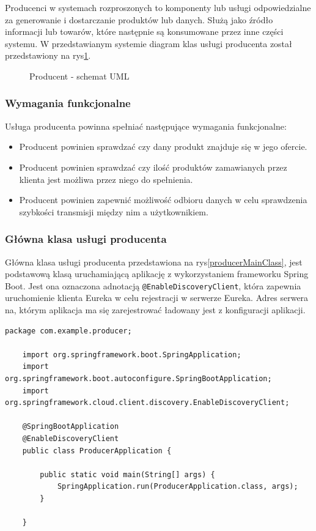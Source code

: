 Producenci w systemach rozproszonych to komponenty lub usługi odpowiedzialne za generowanie i dostarczanie produktów lub danych. Służą jako źródło informacji lub towarów, które następnie są konsumowane przez inne części systemu. W przedstawianym systemie diagram klas usługi producenta został przedstawiony na rys\ref{ProducerUML}.

\begin{figure}[!htbp]
    \centering
    
    \caption{Producent - schemat UML}
    \label{ProducerUML}
\end{figure}

\subsubsection{Wymagania funkcjonalne}

Usługa producenta powinna spełniać następujące wymagania funkcjonalne:

\begin{itemize}
    \item Producent powinien sprawdzać czy dany produkt znajduje się w jego ofercie.
    \item Producent powinien sprawdzać czy ilość produktów zamawianych przez klienta jest możliwa przez niego do spełnienia. 
    \item Producent powinien zapewnić możliwość odbioru danych w celu sprawdzenia szybkości transmisji między nim a użytkownikiem.
\end{itemize}


\subsubsection{Główna klasa usługi producenta}

Główna klasa usługi producenta przedstawiona na rys\ref{producerMainClass}, jest podstawową klasą uruchamiającą aplikację z wykorzystaniem frameworku Spring Boot. Jest ona oznaczona adnotacją \verb|@EnableDiscoveryClient|, która zapewnia uruchomienie klienta Eureka w celu rejestracji w serwerze Eureka. Adres serwera na, którym aplikacja ma się zarejestrować  ładowany jest z konfiguracji aplikacji.

\begin{lstlisting}[caption=Główna klasa usługi producenta, label=producerMainClass]
    package com.example.producer;

    import org.springframework.boot.SpringApplication;
    import org.springframework.boot.autoconfigure.SpringBootApplication;
    import org.springframework.cloud.client.discovery.EnableDiscoveryClient;
    
    @SpringBootApplication
    @EnableDiscoveryClient
    public class ProducerApplication {
    
        public static void main(String[] args) {
            SpringApplication.run(ProducerApplication.class, args);
        }
    
    }
\end{lstlisting}

